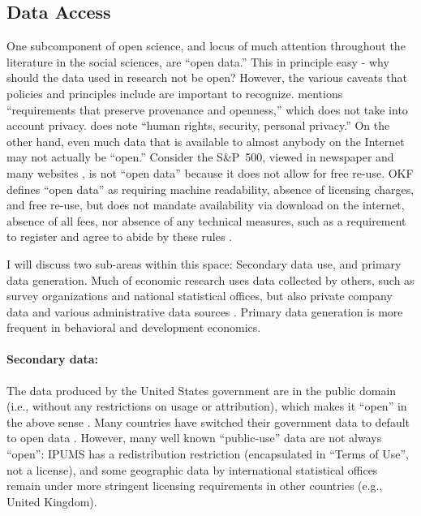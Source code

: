 \documentclass{Revue-economique}
\newcommand{\citep}{\parencite}
\newcommand{\citet}{\textcite}
\begin{document}
\begin{Article} [%
	Titre={Reproducibility and Open Science in Economics},
	Auteur={Lars Vilhuber\thanks{Cornell University, lars.vilhuber@cornell.edu}}]
\begin{refsection}[Main]


\section{Data Access}
\label{sec:data_access}

One subcomponent of open science, and locus of much attention throughout the literature in the social sciences, are ``open data.'' This in principle easy - why should the data used in research not be open? However, the various caveats that policies and principles include are important to recognize. \parencite[OKF]{open_knowledge_foundation_defining_2024} mentions ``requirements that preserve provenance and openness,'' which does not take into account privacy. \citet{unesco_understanding_2022} does note  ``human rights, security, personal privacy.'' On the other hand, even much data that is available to almost anybody on the Internet may not actually be ``open.''  Consider the S\&P~500, viewed in newspaper and many websites \parencite[e.g.][]{sp_dow_jones_indices_llc_sp_2025}, is not ``open data'' because it does not allow for free re-use. OKF defines 
``open data'' as requiring machine readability, absence of licensing charges, and free re-use, but does not mandate availability via download on the internet, absence of all fees, nor absence of any technical measures, such as a requirement to register and agree to abide by these rules \citep{open_knowledge_foundation_defining_2024}. 

I will discuss two sub-areas within this space: Secondary data use, and primary data generation. Much of economic research uses data collected by others, such as survey organizations and national statistical offices, but also private company data and various administrative data sources \citep[``organic data'', ][]{groves_designed_2011,groves_three_2011}. Primary data generation is more frequent in behavioral and development economics. 

\paragraph{Secondary data:} The data produced by the United States government are in the public domain (i.e., without any restrictions on usage or attribution), which makes it ``open'' in the above sense \citep[Copyright Act of 1976, ][]{wikipedia_copyright_2025}. Many countries have switched their government data to default to open data \parencite{statistics_canada_statistics_2012,uk_government_open_2014}. However, many well known ``public-use'' data are not always ``open'': IPUMS has a redistribution restriction (encapsulated in ``Terms of Use'', not a license), and some geographic data by international statistical offices remain under more stringent licensing requirements in other countries (e.g., United Kingdom).


\end{refsection}
\end{Article}
\end{document}
